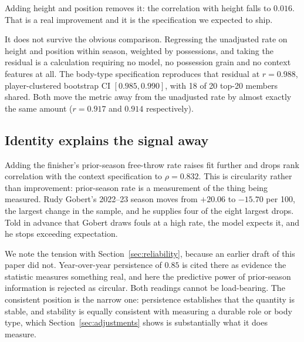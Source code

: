 \documentclass[11pt,letterpaper]{article}
\begin{document}
Adding height and position removes it: the correlation with height falls to
$0.016$. That is a real improvement and it is the specification we expected to
ship.

It does not survive the obvious comparison. Regressing the unadjusted rate on
height and position within season, weighted by possessions, and taking the
residual is a calculation requiring no model, no possession grain and no context
features at all. The body-type specification reproduces that residual at
$r = 0.988$, player-clustered bootstrap CI $[0.985, 0.990]$, with 18 of 20
top-20 members shared. Both move the metric away from the unadjusted rate by
almost exactly the same amount ($r = 0.917$ and $0.914$ respectively).

\subsection{Identity explains the signal away}

Adding the finisher's prior-season free-throw rate raises fit further and drops
rank correlation with the context specification to $\rho = 0.832$. This is
circularity rather than improvement: prior-season rate is a measurement of the
thing being measured. Rudy Gobert's 2022--23 season moves from $+20.06$ to
$-15.70$ per 100, the largest change in the sample, and he supplies four of the
eight largest drops. Told in advance that Gobert draws fouls at a high rate, the
model expects it, and he stops exceeding expectation.

We note the tension with Section~\ref{sec:reliability}, because an earlier draft
of this paper did not. Year-over-year persistence of $0.85$ is cited there as
evidence the statistic measures something real, and here the predictive power of
prior-season information is rejected as circular. Both readings cannot be
load-bearing. The consistent position is the narrow one: persistence establishes
that the quantity is stable, and stability is equally consistent with measuring a
durable role or body type, which Section~\ref{sec:adjustments} shows is
substantially what it does measure.
\end{document}
